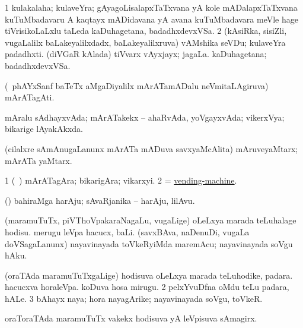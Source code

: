 \bentry
{} 
\gl{\nA}
\expl{}
\bmng
\bnum
\num{1} kulakalaha; kulaveYra; gAyagoLisalapxTaTxvana yA kole mADalapxTaTxvana kuTuMbadavaru A kaqtayx mADidavana yA avana kuTuMbadavara meVle hage tiVrisikoLaLxlu taLeda kaDuhagetana, badadhxdevxVSa. 
\num{2} (kAsiRka, sisiZli, \mo vugaLalilx baLakeyalilxdadx, baLakeyalilxruva) vAMshika seVDu; kulaveYra padadhxti. 
 (diVGaR kAlada) 
\banum
{} tiVvarx vAyxjayx; jagaLa. 
 kaDuhagetana; badadhxdevxVSa. 
\eanum
\numie
\enum
\emng
\eentry

\bentry 
{} 
\gl{\nA}
\expl{\F\ }
\bmng
 (\kanmu\ phAYxSanf baTeTx aMgaDiyalilx mArATamADalu neVmitaLAgiruva) mArATagAti. 
\emng
\eentry

\bentry
{} 
\gl{\gu}
\expl{}
\bmng
 mAralu sAdhayxvAda; mArATakekx -- ahaRvAda, yoVgayxvAda; vikerxVya; bikarige lAyakAkxda. 
\emng
\eentry

\bentry
{} 
\gl{\nA}
\expl{}
\bmng
 (cilalxre sAmAnugaLanunx mArATa mADuva savxyaMcAlita) mAruveyaMtarx; mArATa yaMtarx. 
\emng
\eentry

\bentry
{} 
\gl{\nA}
\expl{}
\bmng
\bnum
\num{1} (\kanmu\ \nAyxshA) mArATagAra; bikarigAra; vikarxyi. 
\num{2} = \hyperlink{vending-machine}{vending-machine}. 
\enum
\emng
\eentry

\bentry
{} 
\gl{\nA}
\expl{}
\bmng
(\ame) bahiraMga harAju; sAvaRjanika -- harAju, lilAvu. 
\emng
\eentry

\bentry
{} 
\gl{\sakirx}
\expl{}
\bmng
\bnum
{} (maramuTuTx, piVThoVpakaraNagaLu, \mo vugaLige) 
\banum
{} oLeLxya marada teLuhalage hodisu. 
 merugu leVpa hacucx, baLi. (savxBAva, naDenuDi, \mo vugaLa doVSagaLanunx) nayavinayada toVkeRyiMda maremAcu; nayavinayada soVgu hAku. 
\eanum
\numie
\enum
\emng
\eentry

\bentry
{} 
\gl{\nA}
\expl{}
\bmng
\bnum
{} (oraTAda maramuTuTxgaLige) 
\banum
{} hodisuva oLeLxya marada teLuhodike, padara. 
 hacucxva horaleVpa. 
 koDuva hosa mirugu. 
\eanum
\numie
\num{2} pelxYvuDfna oMdu teLu padara, hALe. 
\num{3} bAhayx naya; hora nayagArike; nayavinayada soVgu, toVkeR. 
\enum
\emng
\eentry

\bentry
{} 
\gl{\nA}
\expl{}
\bmng
 oraToraTAda maramuTuTx \mo vakekx hodisuva yA leVpisuva sAmagirx. 
\emng
\eentry

